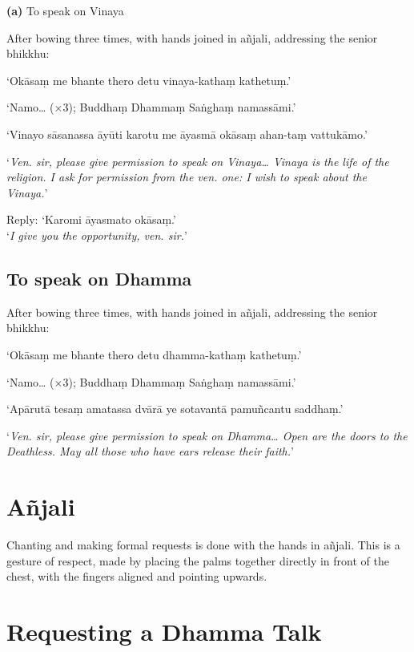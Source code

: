 \textbf{(a)} To speak on Vinaya

\begin{instruction}
  After bowing three times, with hands joined in añjali, addressing the senior
  bhikkhu:
\end{instruction}

‘Okāsaṃ me bhante thero detu vinaya-kathaṃ kathetuṃ.’

‘Namo… (×3); Buddhaṃ Dhammaṃ Saṅghaṃ namassāmi.’

‘Vinayo sāsanassa āyūti karotu me āyasmā okāsaṃ ahan-taṃ vattukāmo.’

‘\emph{Ven. sir, please give permission to speak on Vinaya… Vinaya is the life
  of the religion. I ask for permission from the ven. one: I wish to speak about
  the Vinaya.}’

Reply: ‘Karomi āyasmato okāsaṃ.’\\
‘\emph{I give you the opportunity, ven. sir.}’ 

\subsection{To speak on Dhamma}

\begin{instruction}
  After bowing three times, with hands joined in añjali, addressing the senior
  bhikkhu:
\end{instruction}

‘Okāsaṃ me bhante thero detu dhamma-kathaṃ kathetuṃ.’

‘Namo… (×3); Buddhaṃ Dhammaṃ Saṅghaṃ namassāmi.’

‘Apārutā tesaṃ amatassa dvārā ye sotavantā pamuñcantu saddhaṃ.’

‘\emph{Ven. sir, please give permission to speak on Dhamma… Open are the doors
  to the Deathless. May all those who have ears release their faith.}’

\section{Añjali}

Chanting and making formal requests is done with the hands in añjali.
This is a gesture of respect, made by placing the palms together
directly in front of the chest, with the fingers aligned and pointing
upwards.

\section{Requesting a Dhamma Talk}

